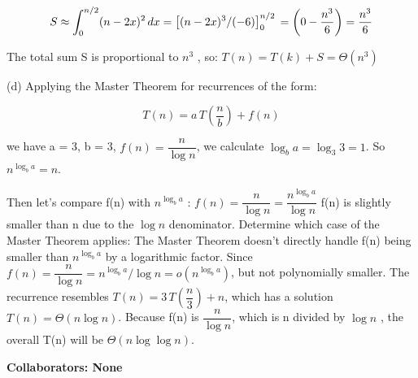 \documentclass[12 pt]{article}
\begin{document}
\[
S \approx \int_{0}^{n/2} (n - 2x)^2 \, dx \\
= \left[ (n - 2x)^3 / (-6) \right]_0^{n/2} \\
= \left( 0 - \frac{n^3}{6} \right) = \frac{n^3}{6}
\]

The total sum  S  is proportional to  $n^3$ , so: $T(n) = T(k) + S = \Theta(n^3)$

(d) Applying the Master Theorem for recurrences of the form:

\[
T(n) = a\, T\left( \dfrac{n}{b} \right) + f(n)
\]

we have a = 3, b = 3, \( f(n) = \dfrac{n}{\log n} \), we calculate $\log_b a = \log_3 3 = 1$. So $n^{\log_b a} = n$.

Then let's compare  f(n)  with  $n^{\log_b a}$ : \( f(n) = \dfrac{n}{\log n} = \dfrac{n^{\log_b a}}{\log n} \)
f(n)  is slightly smaller than  n  due to the  $\log n$  denominator. Determine which case of the Master Theorem applies:
The Master Theorem doesn’t directly handle  f(n)  being smaller than  $n^{\log_b a}$  by a logarithmic factor. Since \( f(n) = \dfrac{n}{\log n} = n^{\log_b a} / \log n = o\left( n^{\log_b a} \right) \), but not polynomially smaller. The recurrence resembles \( T(n) = 3\, T\left( \dfrac{n}{3} \right) + n \), which has a solution  $T(n) = \Theta(n \log n)$. Because  f(n)  is \( \dfrac{n}{\log n} \), which is  n  divided by  $\log n$ , the overall  T(n)  will be $\Theta(n \log \log n)$.


\vspace{1cm}

\noindent\textbf{Collaborators: None}
\end{document}
